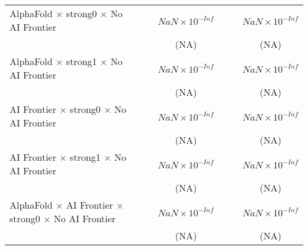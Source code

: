 \begin{tabular}{lcccccc}
   AlphaFold $\times$ strong0 $\times$ No AI Frontier                         &                        &                        & $NaN\times 10^{-Inf}$  &                        &                        & $NaN\times 10^{-Inf}$\\    
                                                                              &                        &                        & (NA)                   &                        &                        & (NA)\\   
   AlphaFold $\times$ strong1 $\times$ No AI Frontier                         &                        &                        & $NaN\times 10^{-Inf}$  &                        &                        & $NaN\times 10^{-Inf}$\\    
                                                                              &                        &                        & (NA)                   &                        &                        & (NA)\\   
   AI Frontier $\times$ strong0 $\times$ No AI Frontier                       &                        &                        & $NaN\times 10^{-Inf}$  &                        &                        & $NaN\times 10^{-Inf}$\\    
                                                                              &                        &                        & (NA)                   &                        &                        & (NA)\\   
   AI Frontier $\times$ strong1 $\times$ No AI Frontier                       &                        &                        & $NaN\times 10^{-Inf}$  &                        &                        & $NaN\times 10^{-Inf}$\\    
                                                                              &                        &                        & (NA)                   &                        &                        & (NA)\\   
   AlphaFold $\times$ AI Frontier $\times$ strong0 $\times$ No AI Frontier    &                        &                        & $NaN\times 10^{-Inf}$  &                        &                        & $NaN\times 10^{-Inf}$\\    
                                                                              &                        &                        & (NA)                   &                        &                        & (NA)\\   

\end{tabular}
